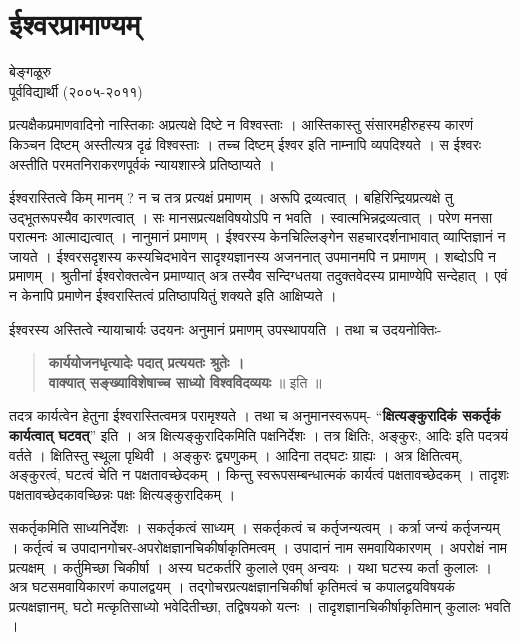 \chapter{ईश्वरप्रामाण्यम्}

\begin{center}
\smallskip

बेङ्गळूरु\\
पूर्वविद्यार्थी (२००५-२०११)
\addrule
\end{center}
प्रत्यक्षैकप्रमाणवादिनो नास्तिकाः अप्रत्यक्षे दिष्टे न विश्वस्ताः । आस्तिकास्तु संसारमहीरुहस्य कारणं किञ्चन दिष्टम् अस्तीत्यत्र दृढं विश्वस्ताः । तच्च दिष्टम् ईश्वर इति नाम्नापि व्यपदिश्यते । स ईश्वरः अस्तीति परमतनिराकरणपूर्वकं न्यायशास्त्रे प्रतिष्ठाप्यते ।

ईश्वरास्तित्वे किम् मानम् ? न च तत्र प्रत्यक्षं प्रमाणम् । अरूपि द्रव्यत्वात् । बहिरिन्द्रियप्रत्यक्षे तु उद्भूतरूपस्यैव कारणत्वात् । सः मानसप्रत्यक्षविषयोऽपि न भवति । स्वात्मभिन्नद्रव्यत्वात् । परेण मनसा परात्मनः आत्माद्यत्वात् । नानुमानं प्रमाणम् । ईश्वरस्य केनचिल्लिङ्गेन सहचारदर्शनाभावात् व्याप्तिज्ञानं न जायते । ईश्वरसदृशस्य कस्यचिदभावेन सादृश्यज्ञानस्य अजननात् उपमानमपि न प्रमाणम् । शब्दोऽपि न प्रमाणम् । श्रुतीनां ईश्वरोक्तत्वेन प्रमाण्यात् अत्र तस्यैव सन्दिग्धतया तदुक्तवेदस्य प्रामाण्येपि सन्देहात् । एवं न केनापि प्रमाणेन ईश्वरास्तित्वं प्रतिष्ठापयितुं शक्यते इति आक्षिप्यते ।

ईश्वरस्य अस्तित्वे न्यायाचार्यः उदयनः अनुमानं प्रमाणम् उपस्थापयति । तथा च उदयनोक्तिः-
\begin{verse}
\textbf{कार्ययोजनधृत्यादेः पदात् प्रत्ययतः श्रुतेः ।\\
वाक्यात् सङ्ख्याविशेषाच्च साध्यो विश्वविदव्ययः} ॥ इति ॥
\end{verse}
तदत्र कार्यत्वेन हेतुना ईश्वरास्तित्वमत्र परामृश्यते । तथा च अनुमानस्वरूपम्- “\textbf{क्षित्यङ्कुरादिकं सकर्तृकं कार्यत्वात् घटवत्}” इति । अत्र क्षित्यङ्कुरादिकमिति पक्षनिर्देशः । तत्र क्षितिः, अङ्कुरः, आदिः इति पदत्रयं वर्तते । क्षितिस्तु स्थूला पृथिवी । अङ्कुरः द्व्यणुकम् । आदिना तद्घटः ग्राह्यः । अत्र क्षितित्वम्, अङ्कुरत्वं, घटत्वं चेति न पक्षतावच्छेदकम् । किन्तु स्वरूपसम्बन्धात्मकं कार्यत्वं पक्षतावच्छेदकम् । तादृशः पक्षतावच्छेदकावच्छिन्नः पक्षः क्षित्यङ्कुरादिकम् ।

सकर्तृकमिति साध्यनिर्देशः । सकर्तृकत्वं साध्यम् । सकर्तृकत्वं च कर्तृजन्यत्वम् । कर्त्रा जन्यं कर्तृजन्यम् । कर्तृत्वं च उपादानगोचर-अपरोक्षज्ञानचिकीर्षाकृतिमत्वम् । उपादानं नाम समवायिकारणम् । अपरोक्षं नाम प्रत्यक्षम् । कर्तुमिच्छा चिकीर्षा । अस्य घटकर्तरि कुलाले एवम् अन्वयः । यथा घटस्य कर्ता कुलालः । अत्र घटसमवायिकारणं कपालद्वयम् । तद्गोचरप्रत्यक्षज्ञानचिकीर्षा कृतिमत्वं च कपालद्वयविषयकं प्रत्यक्षज्ञानम्, घटो मत्कृतिसाध्यो भवेदितीच्छा, तद्विषयको यत्नः । तादृशज्ञानचिकीर्षाकृतिमान् कुलालः भवति ।

